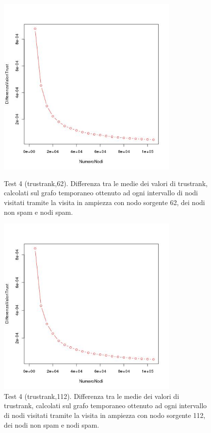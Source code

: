 \begin{figure}
 \centering
 \includegraphics[height=9cm]{immagini/test4/averageTest_trust_62}
  \caption{Test 4 (trustrank,62). Differenza tra le medie dei valori di trustrank, calcolati sul grafo temporaneo ottenuto ad ogni intervallo di nodi visitati tramite la visita in ampiezza con nodo sorgente 62, dei nodi non spam e nodi spam.}
 \label{fig:test4trust62}
  \centering
 \includegraphics[height=9cm]{immagini/test4/averageTest_trust_112}
  \caption{Test 4 (trustrank,112). Differenza tra le medie dei valori di trustrank, calcolati sul grafo temporaneo ottenuto ad ogni intervallo di nodi visitati tramite la visita in ampiezza con nodo sorgente 112, dei nodi non spam e nodi spam.}
 \label{fig:test4trust112}
\end{figure}
 

 
